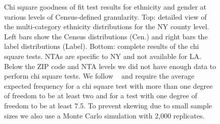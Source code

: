\begin{figure}[t]
{\begin{tabular}{| l | c | c | c | c | c |}
\end{tabular}
}
\caption{Chi square goodness of fit test results for ethnicity and gender at various levels of Census-defined granularity. Top: detailed view of the multi-category ethnicity distributions for the NY county level. Left bars show the Census distributions (Cen.) and right bars the label distributions (Label). Bottom: complete results of the chi square tests. NTAs are specific to NY and not available for LA. Below the ZIP code and NTA levels we did not have enough data to perform chi square tests. We follow ~\protect\cite{Roscoe:1971} and require the average expected frequency for a chi square test with more than one degree of freedom to be at least two and for a test with one degree of freedom to be at least 7.5. To prevent skewing due to small sample sizes we also use a Monte Carlo simulation with 2,000 replicates.}
\label{fig:map}
\end{figure}

